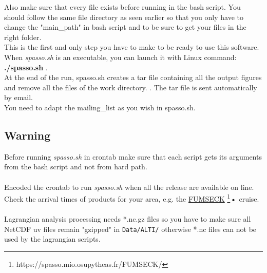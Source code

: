 \documentclass[12pt,a4paper]{article}
\begin{document}
Also make sure that every file exists before running in the bash script. You should follow the same file directory as seen earlier so that you only have to change the "main\_path" in bash script and to be sure to get your files in the right folder. \\
This is the first and only step you have to make to be ready to use this software. When \textit{spasso.sh} is an executable, you can launch it with Linux command: \textbf{./spasso.sh} .\\

At the end of the run, spasso.sh creates a tar file containing all the output figures and remove all the files of the work directory. . The tar file is sent automatically by email.\\
You need to adapt the mailing\_list as you wish in spasso.sh. \\

\subsection{Warning}
Before running \textit{spasso.sh} in crontab make sure that each script gets its arguments from the bash script and not from hard path. \\
\\
Encoded the crontab to run \textit{spasso.sh} when all the release are available on line. Check the arrival times of products for your area, e.g. the \href{https://spasso.mio.osupytheas.fr/FUMSECK/}{FUMSECK} \footnote{https://spasso.mio.osupytheas.fr/FUMSECK/}\textbf{•} cruise. \\
\\
Lagrangian analysis processing needs *.nc.gz files so you have to make sure all NetCDF uv files remain "gzipped" in \texttt{Data/ALTI/} otherwise *.nc files can not be used by the lagrangian scripts.


\newpage
\end{document}
